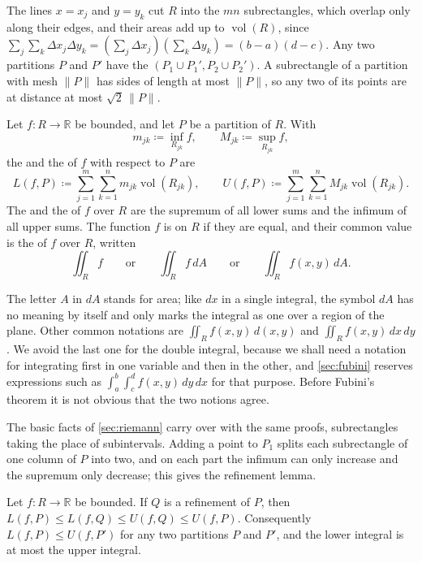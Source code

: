 The lines $x=x_j$ and $y=y_k$ cut $R$ into the $mn$ subrectangles, which overlap only along their edges, and their areas add up to $\operatorname{vol}(R)$, since $\sum_j\sum_k\Delta x_j\Delta y_k=(\sum_j\Delta x_j)(\sum_k\Delta y_k)=(b-a)(d-c)$. Any two partitions $P$ and $P'$ have the  $(P_1\cup P_1',P_2\cup P_2')$. A subrectangle of a partition with mesh $\|P\|$ has sides of length at most $\|P\|$, so any two of its points are at distance at most $\sqrt2\,\|P\|$.

\begin{definition}
\label{def:double-integral}
Let $f\colon R\to\mathbb R$ be bounded, and let $P$ be a partition of $R$. With
\[
m_{jk}\coloneqq\inf_{R_{jk}}f,\qquad M_{jk}\coloneqq\sup_{R_{jk}}f ,
\]
the  and the  of $f$ with respect to $P$ are
\[
L(f,P)\coloneqq\sum_{j=1}^m\sum_{k=1}^nm_{jk}\operatorname{vol}(R_{jk}),\qquad U(f,P)\coloneqq\sum_{j=1}^m\sum_{k=1}^nM_{jk}\operatorname{vol}(R_{jk}).
\]
The  and the  of $f$ over $R$ are the supremum of all lower sums and the infimum of all upper sums. The function $f$ is  on $R$ if they are equal, and their common value is the  of $f$ over $R$, written
\[
\iint_Rf\qquad\text{or}\qquad\iint_Rf\,dA\qquad\text{or}\qquad\iint_Rf(x,y)\,dA .
\]
\end{definition}

The letter $A$ in $dA$ stands for area; like $dx$ in a single integral, the symbol $dA$ has no meaning by itself and only marks the integral as one over a region of the plane. Other common notations are $\iint_Rf(x,y)\,d(x,y)$ and $\iint_Rf(x,y)\,dx\,dy$. We avoid the last one for the double integral, because we shall need a notation for integrating first in one variable and then in the other, and \cref{sec:fubini} reserves expressions such as $\int_a^b\int_c^df(x,y)\,dy\,dx$ for that purpose. Before Fubini's theorem it is not obvious that the two notions agree.

The basic facts of \cref{sec:riemann} carry over with the same proofs, subrectangles taking the place of subintervals. Adding a point to $P_1$ splits each subrectangle of one column of $P$ into two, and on each part the infimum can only increase and the supremum only decrease; this gives the refinement lemma.

\begin{lemma}[Refinement]
\label{lem:refinement-2d}
Let $f\colon R\to\mathbb R$ be bounded. If $Q$ is a refinement of $P$, then $L(f,P)\le L(f,Q)\le U(f,Q)\le U(f,P)$. Consequently $L(f,P)\le U(f,P')$ for any two partitions $P$ and $P'$, and the lower integral is at most the upper integral.
\end{lemma}

